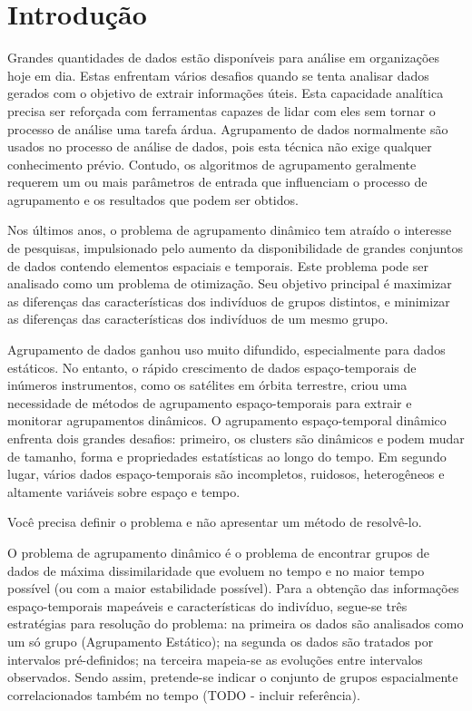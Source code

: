 \chapter{Introdução}
\label{cap:introducao}
Grandes quantidades de dados estão disponíveis para análise em organizações hoje em dia.
Estas enfrentam vários desafios quando se tenta analisar dados gerados com o objetivo de
extrair informações úteis.
Esta capacidade analítica precisa ser reforçada com ferramentas capazes de lidar com eles sem tornar o processo de análise uma tarefa árdua.
Agrupamento de dados normalmente são usados no processo de análise de dados, pois esta técnica
não exige qualquer conhecimento prévio. Contudo, os algoritmos de agrupamento
geralmente requerem um ou mais parâmetros de entrada que influenciam o processo de
agrupamento e os resultados que podem ser obtidos. 

Nos últimos anos, o problema de agrupamento dinâmico tem atraído o interesse de pesquisas,
impulsionado pelo aumento da disponibilidade de grandes conjuntos de dados contendo
elementos espaciais e temporais. Este problema pode ser analisado como um problema de
otimização. Seu objetivo principal é maximizar as diferenças das características dos
indivíduos de grupos distintos, e minimizar as diferenças das características dos
indivíduos de um mesmo grupo.


Agrupamento de dados ganhou uso muito difundido, especialmente para dados estáticos.
No entanto, o rápido crescimento de dados espaço-temporais de inúmeros instrumentos,
como os satélites em órbita terrestre, criou uma necessidade de métodos de agrupamento
espaço-temporais para extrair e monitorar agrupamentos dinâmicos. O agrupamento espaço-temporal
dinâmico enfrenta dois grandes desafios: primeiro, os clusters são dinâmicos e podem mudar de
tamanho, forma e propriedades estatísticas ao longo do tempo. Em segundo lugar, vários dados
espaço-temporais são incompletos, ruidosos, heterogêneos e altamente variáveis sobre espaço e tempo.

Você precisa definir o problema e não apresentar um método de resolvê-lo.

O problema de agrupamento dinâmico é o problema de encontrar grupos de dados de máxima dissimilaridade que evoluem no tempo e no maior tempo possível (ou com a maior estabilidade possível).
Para a obtenção das informações espaço-temporais mapeáveis e características do indivíduo, segue-se três estratégias para resolução do problema: na primeira os dados são analisados
como um só grupo (Agrupamento Estático); na segunda os dados são tratados por intervalos pré-definidos; na terceira mapeia-se as evoluções entre intervalos observados. Sendo assim, pretende-se indicar o conjunto de grupos espacialmente correlacionados também no tempo (TODO - incluir referência).

